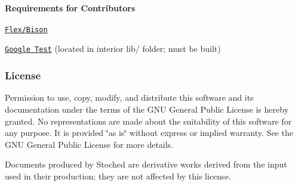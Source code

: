 \paragraph*{Requirements for Contributors}


\begin{DoxyItemize}
\item \href{https://www.gnu.org/software/bison/}{\tt Flex/\+Bison}
\item \href{https://github.com/google/googletest}{\tt Google Test} (located in interior lib/ folder; must be built)
\end{DoxyItemize}

\subsubsection*{License}

Permission to use, copy, modify, and distribute this software and its documentation under the terms of the G\+NU General Public License is hereby granted. No representations are made about the suitability of this software for any purpose. It is provided \char`\"{}as is\char`\"{} without express or implied warranty. See the G\+NU General Public License for more details.

Documents produced by Stoched are derivative works derived from the input used in their production; they are not affected by this license. 